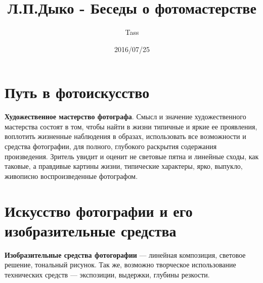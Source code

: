 \documentclass{article}
\begin{document}
\title{Л.П.Дыко - Беседы о фотомастерстве}
\author{Tass}
\date{2016/07/25}
\maketitle

\tableofcontents
\newpage
\section{Путь в фотоискусство}
\textbf{Художественное мастерство фотографа}. Смысл и значение художественного мастерства состоят в том, чтобы найти в жизни типичные и яркие ее проявления, воплотить жизненные наблюдения в образах, использовать все возможности и средства фотографии, для полного, глубокого раскрытия содержания произведения. Зритель увидит и оценит не световые пятна и линейные сходы, как таковые, а правдивые картины жизни, типические характеры, ярко, выпукло, живописно воспроизведенные фотографом.

\section{Искусство фотографии и его изобразительные средства}
\textbf{Изобразительные средства фотогорафии} --- линейная композиция, световое решение, тональный рисунок. Так же, возможно творческое использование технических средств --- экспозиции, выдержки, глубины резкости.
\end{document}
